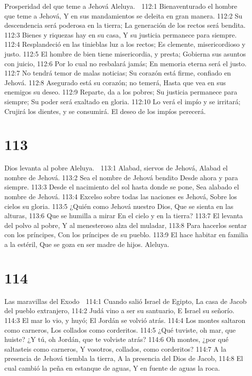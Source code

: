 Prosperidad del que teme a Jehová 
Aleluya. 

112:1 Bienaventurado el hombre que teme a Jehová, 
Y en sus mandamientos se deleita en gran manera. 
112:2 Su descendencia será poderosa en la tierra; 
La generación de los rectos será bendita. 
112:3 Bienes y riquezas hay en su casa, 
Y su justicia permanece para siempre. 
112:4 Resplandeció en las tinieblas luz a los rectos; 
Es clemente, misericordioso y justo. 
112:5 El hombre de bien tiene misericordia, y presta; 
Gobierna sus asuntos con juicio, 
112:6 Por lo cual no resbalará jamás; 
En memoria eterna será el justo. 
112:7 No tendrá temor de malas noticias; 
Su corazón está firme, confiado en Jehová. 
112:8 Asegurado está su corazón; no temerá, 
Hasta que vea en sus enemigos su deseo. 
112:9 Reparte, da a los pobres; 
Su justicia permanece para siempre; 
Su poder será exaltado en gloria. 
112:10 Lo verá el impío y se irritará; 
Crujirá los dientes, y se consumirá. 
El deseo de los impíos perecerá. 

\chapter{113}

Dios levanta al pobre 
Aleluya. 

113:1 Alabad, siervos de Jehová, 
Alabad el nombre de Jehová. 
113:2 Sea el nombre de Jehová bendito 
Desde ahora y para siempre. 
113:3 Desde el nacimiento del sol hasta donde se pone, 
Sea alabado el nombre de Jehová. 
113:4 Excelso sobre todas las naciones es Jehová, 
Sobre los cielos su gloria. 
113:5 ¿Quién como Jehová nuestro Dios, 
Que se sienta en las alturas, 
113:6 Que se humilla a mirar 
En el cielo y en la tierra? 
113:7 El levanta del polvo al pobre, 
Y al menesteroso alza del muladar, 
113:8 Para hacerlos sentar con los príncipes, 
Con los príncipes de su pueblo. 
113:9 El hace habitar en familia a la estéril, 
Que se goza en ser madre de hijos. 
Aleluya. 

\chapter{114}

Las maravillas del Exodo 

114:1 Cuando salió Israel de Egipto, 
La casa de Jacob del pueblo extranjero, 
114:2 Judá vino a ser su santuario, 
E Israel su señorío. 
114:3 El mar lo vio, y huyó; 
El Jordán se volvió atrás. 
114:4 Los montes saltaron como carneros, 
Los collados como corderitos. 
114:5 ¿Qué tuviste, oh mar, que huiste? 
¿Y tú, oh Jordán, que te volviste atrás? 
114:6 Oh montes, ¿por qué saltasteis como carneros, 
Y vosotros, collados, como corderitos? 
114:7 A la presencia de Jehová tiembla la tierra, 
A la presencia del Dios de Jacob, 
114:8 El cual cambió la peña en estanque de aguas, 
Y en fuente de aguas la roca. 

